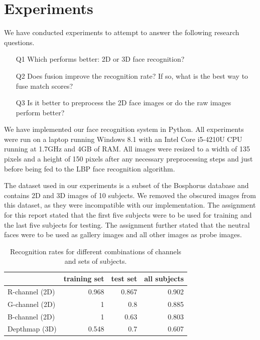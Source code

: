 \documentclass[]{article}
\begin{document}
\section{Experiments}
\graphicspath{{img/experiments/}}
We have conducted experiments to attempt to answer the following research questions.
\begin{itemize}
	\item[Q1] Which performs better: 2D or 3D face recognition?
	\item[Q2] Does fusion improve the recognition rate? If so, what is the best way to fuse match scores?
	\item[Q3] Is it better to preprocess the 2D face images or do the raw images perform better?
\end{itemize}

We have implemented our face recognition system in Python. All experiments were run on a laptop running Windows 8.1 with an Intel Core i5-4210U CPU running at 1.7GHz and 4GB of RAM. All images were resized to a width of 135 pixels and a height of 150 pixels after any necessary preprocessing steps and just before being fed to the LBP face recognition algorithm.

The dataset used in our experiments is a subset of the Bosphorus database and contains 2D and 3D images of 10 subjects. We removed the obscured images from this dataset, as they were incompatible with our implementation. The assignment for this report stated that the first five subjects were to be used for training and the last five subjects for testing. The assignment further stated that the neutral faces were to be used as gallery images and all other images as probe images. 

\begin{table}
	\centering
	\begin{tabular}{lrrr}
		\toprule
		& training set & test set & all subjects\\
		\midrule
		R-channel (2D) & 0.968 & 0.867 & 0.902\\
		G-channel (2D) & 1 & 0.8 & 0.885 \\
		B-channel (2D) & 1 & 0.63 & 0.803 \\
		Depthmap (3D) & 0.548 & 0.7 & 0.607 \\
		\bottomrule
	\end{tabular}
	\caption{Recognition rates for different combinations of channels and sets of subjects.}
	\label{tab:traintestall}
\end{table}
\end{document}
